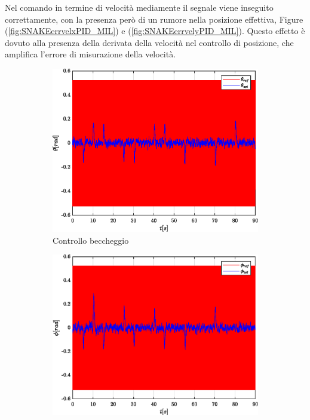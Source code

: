 Nel comando in termine di velocità mediamente il segnale viene inseguito correttamente, con la presenza però di un rumore nella posizione effettiva, Figure (\ref{fig:SNAKEerrvelxPID_MIL}) e (\ref{fig:SNAKEerrvelyPID_MIL}). Questo effetto è dovuto alla presenza della derivata della velocità nel controllo di posizione, che amplifica l'errore di misurazione della velocità.

\begin{figure}
	\centering
	\begin{subfigure}{0.45\textwidth}
		\centering
		\includegraphics[width=1\textwidth]{Simulazioni/Figure/PID/SNAKE_MIL/AttitudeControlPitch}
		\caption{Controllo beccheggio}
		\label{fig:SNAKEbecPID_MIL}
	\end{subfigure}
	\hfill
	\begin{subfigure}{0.45\textwidth}
		\centering
		\includegraphics[width=1\textwidth]{Simulazioni/Figure/PID/SNAKE_MIL/AttitudeControlRoll}

\end{subfigure}
\end{figure}
